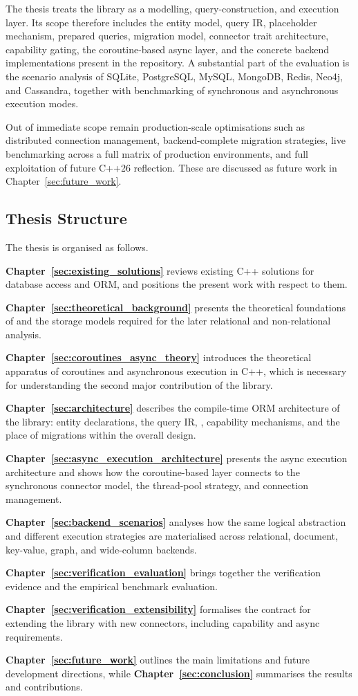 The thesis treats the library as a modelling, query-construction, and execution layer. Its scope therefore includes the entity model, query IR, placeholder mechanism, prepared queries, migration model, connector trait architecture, capability gating, the coroutine-based async layer, and the concrete backend implementations present in the repository. A substantial part of the evaluation is the scenario analysis of SQLite, PostgreSQL, MySQL, MongoDB, Redis, Neo4j, and Cassandra, together with benchmarking of synchronous and asynchronous execution modes.

Out of immediate scope remain production-scale optimisations such as distributed connection management, backend-complete migration strategies, live benchmarking across a full matrix of production environments, and full exploitation of future C++26 reflection. These are discussed as future work in Chapter~\ref{sec:future_work}.

\subsection{Thesis Structure}

The thesis is organised as follows.

\textbf{Chapter~\ref{sec:existing_solutions}} reviews existing C++ solutions for database access and ORM, and positions the present work with respect to them.

\textbf{Chapter~\ref{sec:theoretical_background}} presents the theoretical foundations of \ORMName{} and the storage models required for the later relational and non-relational analysis.

\textbf{Chapter~\ref{sec:coroutines_async_theory}} introduces the theoretical apparatus of coroutines and asynchronous execution in C++, which is necessary for understanding the second major contribution of the library.

\textbf{Chapter~\ref{sec:architecture}} describes the compile-time ORM architecture of the library: entity declarations, the query IR, , capability mechanisms, and the place of migrations within the overall design.

\textbf{Chapter~\ref{sec:async_execution_architecture}} presents the async execution architecture and shows how the coroutine-based layer connects to the synchronous connector model, the thread-pool strategy, and connection management.

\textbf{Chapter~\ref{sec:backend_scenarios}} analyses how the same logical abstraction and different execution strategies are materialised across relational, document, key-value, graph, and wide-column backends.

\textbf{Chapter~\ref{sec:verification_evaluation}} brings together the verification evidence and the empirical benchmark evaluation.

\textbf{Chapter~\ref{sec:verification_extensibility}} formalises the contract for extending the library with new connectors, including capability and async requirements.

\textbf{Chapter~\ref{sec:future_work}} outlines the main limitations and future development directions, while \textbf{Chapter~\ref{sec:conclusion}} summarises the results and contributions.
